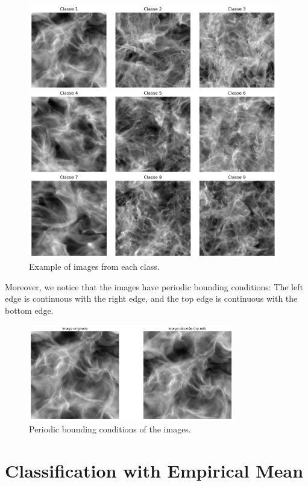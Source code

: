 \documentclass[12pt,a4paper]{article}
\begin{document}
\begin{figure}[H]
    \centering
    \includegraphics[width=0.97\textwidth]{src/classes.png}
    \caption{Example of images from each class.}
    \label{fig:classes}
\end{figure}

Moreover, we notice that the images have periodic bounding conditions: The left edge is continuous with the right edge, and the top edge is continuous with the bottom edge.

\begin{figure}[H]
    \centering
    \includegraphics[width=0.8\textwidth]{src/periodic.png}
    \caption{Periodic bounding conditions of the images.}
    \label{fig:periodic}
\end{figure}


\section{Classification with Empirical Mean}
\end{document}
